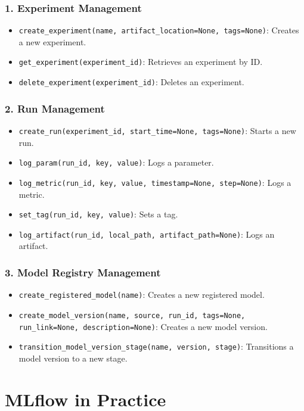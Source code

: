 \documentclass[letterpaper,12pt,notitlepage,twoside]{report}
\begin{document}
\subsubsection*{1. Experiment Management}
\begin{itemize}
    \item \texttt{create\_experiment(name, artifact\_location=None, tags=None)}: Creates a new experiment.
    \item \texttt{get\_experiment(experiment\_id)}: Retrieves an experiment by ID.
    \item \texttt{delete\_experiment(experiment\_id)}: Deletes an experiment.
\end{itemize}

\subsubsection*{2. Run Management}
\begin{itemize}
    \item \texttt{create\_run(experiment\_id, start\_time=None, tags=None)}: Starts a new run.
    \item \texttt{log\_param(run\_id, key, value)}: Logs a parameter.
    \item \texttt{log\_metric(run\_id, key, value, timestamp=None, step=None)}: Logs a metric.
    \item \texttt{set\_tag(run\_id, key, value)}: Sets a tag.
    \item \texttt{log\_artifact(run\_id, local\_path, artifact\_path=None)}: Logs an artifact.
\end{itemize}

\subsubsection*{3. Model Registry Management}
\begin{itemize}
    \item \texttt{create\_registered\_model(name)}: Creates a new registered model.
    \item \texttt{create\_model\_version(name, source, run\_id, tags=None, run\_link=None, description=None)}: Creates a new model version.
    \item \texttt{transition\_model\_version\_stage(name, version, stage)}: Transitions a model version to a new stage.
\end{itemize}

\section{MLflow in Practice}
\end{document}
